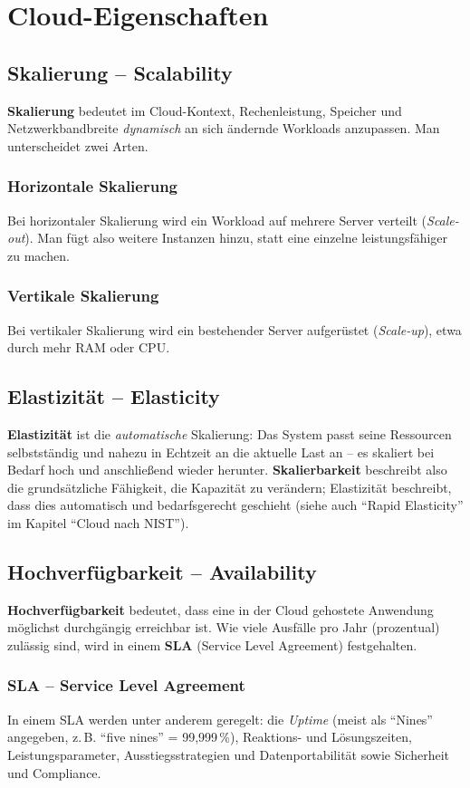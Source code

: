 \section{Cloud-Eigenschaften}
\subsection{Skalierung – Scalability}
\textbf{Skalierung} bedeutet im Cloud-Kontext, Rechenleistung, Speicher und
Netzwerkbandbreite \emph{dynamisch} an sich ändernde Workloads anzupassen. Man
unterscheidet zwei Arten.
\subsubsection{Horizontale Skalierung}
Bei horizontaler Skalierung wird ein Workload auf mehrere Server verteilt
(\textit{Scale-out}). Man fügt also weitere Instanzen hinzu, statt eine einzelne
leistungsfähiger zu machen.
\subsubsection{Vertikale Skalierung}
Bei vertikaler Skalierung wird ein bestehender Server aufgerüstet (\textit{Scale-up}),
etwa durch mehr RAM oder CPU.
\subsection{Elastizität – Elasticity}
\textbf{Elastizität} ist die \emph{automatische} Skalierung: Das System passt seine
Ressourcen selbstständig und nahezu in Echtzeit an die aktuelle Last an – es
skaliert bei Bedarf hoch und anschließend wieder herunter. \textbf{Skalierbarkeit}
beschreibt also die grundsätzliche Fähigkeit, die Kapazität zu verändern;
Elastizität beschreibt, dass dies automatisch und bedarfsgerecht geschieht
(siehe auch \enquote{Rapid Elasticity} im Kapitel \enquote{Cloud nach NIST}).
\subsection{Hochverfügbarkeit – Availability}
\textbf{Hochverfügbarkeit} bedeutet, dass eine in der Cloud gehostete Anwendung
möglichst durchgängig erreichbar ist. Wie viele Ausfälle pro Jahr (prozentual)
zulässig sind, wird in einem \textbf{SLA} (Service Level Agreement) festgehalten.
\subsubsection{SLA – Service Level Agreement}
In einem SLA werden unter anderem geregelt: die \textit{Uptime} (meist als
\enquote{Nines} angegeben, z.\,B. \enquote{five nines} = 99,999\,\%), Reaktions-
und Lösungszeiten, Leistungsparameter, Ausstiegsstrategien und
Datenportabilität sowie Sicherheit und Compliance.
